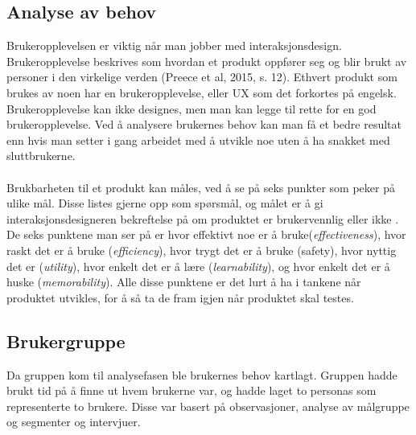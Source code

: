\subsection{Analyse av behov}
Brukeropplevelsen er viktig når man jobber med interaksjonsdesign. Brukeropplevelse beskrives som hvordan et produkt oppfører seg og blir brukt av personer i den virkelige verden (Preece et al, 2015, s. 12). Ethvert produkt som brukes av noen har en brukeropplevelse, eller UX som det forkortes på engelsk. Brukeropplevelse kan ikke designes, men man kan legge til rette for en god brukeropplevelse. Ved å analysere brukernes behov kan man få et bedre resultat enn hvis man setter i gang arbeidet med å utvikle noe uten å ha snakket med sluttbrukerne.
\\\\
Brukbarheten til et produkt kan måles, ved å se på seks punkter som peker på ulike mål. Disse listes gjerne opp som spørsmål, og målet er å gi interaksjonsdesigneren bekreftelse på om produktet er brukervennlig eller ikke \cite[s.~19]{preece}. De seks punktene man ser på er hvor effektivt noe er å bruke(\textit{effectiveness}), hvor raskt det er å bruke (\textit{efficiency}), hvor trygt det er å bruke (safety), hvor nyttig det er (\textit{utility}), hvor enkelt det er å lære (\textit{learnability}), og hvor enkelt det er å huske (\textit{memorability}). Alle disse punktene er det lurt å ha i tankene når produktet utvikles, for å så ta de fram igjen når produktet skal testes. 

\subsection{Brukergruppe}
Da gruppen kom til analysefasen ble brukernes behov kartlagt. Gruppen hadde brukt tid på å finne ut hvem brukerne var, og hadde laget to personas som representerte to brukere. Disse var basert på observasjoner, analyse av målgruppe og segmenter og intervjuer. 


